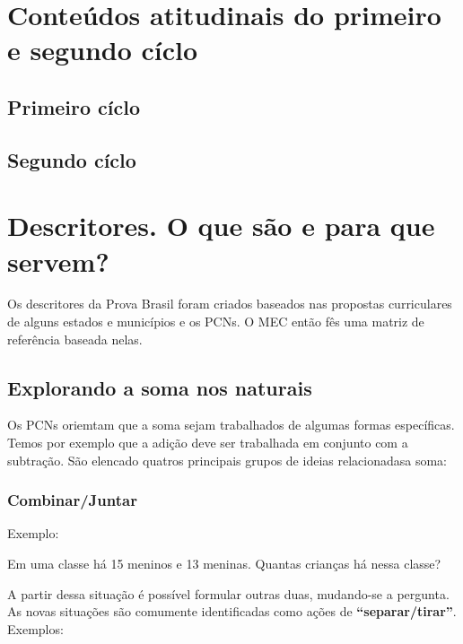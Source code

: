 \section{Conteúdos atitudinais do primeiro e segundo cíclo}

\subsection{Primeiro cíclo}

\subsection{Segundo cíclo}

\section{Descritores. O que são e para que servem?}

Os descritores da Prova Brasil foram criados baseados nas propostas curriculares de alguns estados e municípios e os PCNs. O MEC então fês uma matriz de referência baseada nelas.


\subsection{Explorando a soma nos naturais}
Os PCNs oriemtam que a soma sejam trabalhados de algumas formas específicas. Temos por exemplo que a adição deve ser trabalhada em conjunto com a subtração. 
São elencado quatros principais grupos de ideias relacionadasa soma:

\subsubsection{Combinar/Juntar}

Exemplo:

Em uma classe há 15 meninos e 13 meninas. Quantas crianças há nessa classe?

A partir dessa situação é possível formular outras duas, mudando-se a pergunta. As novas situações são comumente identificadas como ações de \textbf{“separar/tirar”}. Exemplos:

